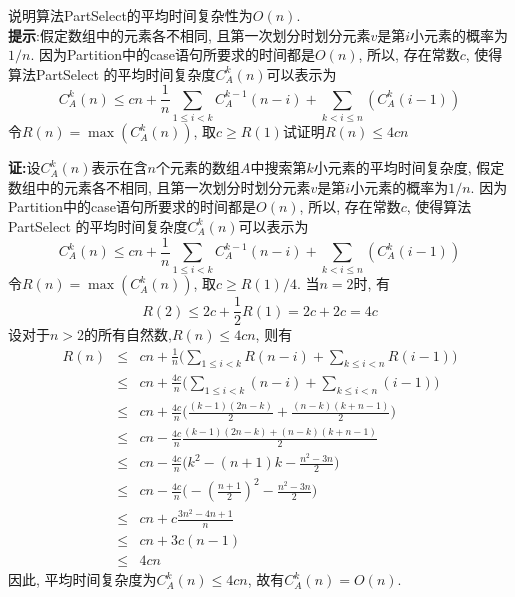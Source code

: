 \begin{problem}[习题3.4]
说明算法PartSelect的平均时间复杂性为$O(n)$.\\
\textbf{提示}:假定数组中的元素各不相同, 且第一次划分时划分元素$v$是第$i$小元素的概率为$1/n$. 因为Partition中的case语句所要求的时间都是$O(n)$, 所以, 存在常数$c$, 使得算法PartSelect 的平均时间复杂度$C_A^k(n)$可以表示为
\[
C_A^k(n)\leq cn+\frac{1}{n}\sum_{1\leq i < k}C_A^{k-1}(n-i) + \sum_{k<i\leq n}(C_A^k(i-1))
\]
令$R(n)=\max(C_A^k(n))$, 取$c\geq R(1)$试证明$R(n)\leq 4cn$
\end{problem}
\begin{solution}
\textbf{证:}设$C_A^k(n)$表示在含$n$个元素的数组$A$中搜索第$k$小元素的平均时间复杂度, 假定数组中的元素各不相同, 且第一次划分时划分元素$v$是第$i$小元素的概率为$1/n$. 因为Partition中的case语句所要求的时间都是$O(n)$, 所以, 存在常数$c$, 使得算法PartSelect 的平均时间复杂度$C_A^k(n)$可以表示为
\[
C_A^k(n)\leq cn+\frac{1}{n}\sum_{1\leq i < k}C_A^{k-1}(n-i) + \sum_{k<i\leq n}(C_A^k(i-1))
\]
令$R(n)=\max(C_A^k(n))$, 取$c\geq R(1)/4$. 当$n=2$时, 有
\[
R(2)\leq 2c + \frac{1}{2}R(1)=2c+2c = 4c
\]
设对于$n>2$的所有自然数,$R(n)\leq 4cn$, 则有
{\setlength\arraycolsep{2pt}
\begin{eqnarray}
R(n) & \leq & cn+\frac{1}{n}\Big(\sum_{1\leq i< k}R(n-i) + \sum_{k\leq i<n}R(i-1)\Big)
\nonumber\\
& \leq & cn + \frac{4c}{n}\Big(\sum_{1\leq i< k}(n-i) + \sum_{k\leq i<n}(i-1)\Big)
\nonumber\\
& \leq & cn + \frac{4c}{n}\Big(\frac{(k-1)(2n-k)}{2}+\frac{(n-k)(k+n-1)}{2}\Big)
\nonumber\\
& \leq & cn - \frac{4c}{n}\frac{(k-1)(2n-k)+(n-k)(k+n-1)}{2}
\nonumber\\
& \leq & cn - \frac{4c}{n}\Big(k^2-(n+1)k-\frac{n^2-3n}{2}\Big)
\nonumber\\
& \leq & cn - \frac{4c}{n}\Big(-(\frac{n+1}{2})^2-\frac{n^2-3n}{2}\Big)
\nonumber\\
& \leq & cn + c\frac{3n^2-4n+1}{n}
\nonumber\\
& \leq & cn + 3c(n-1)
\nonumber\\
& \leq & 4cn
\nonumber
\end{eqnarray}}
因此, 平均时间复杂度为$C_A^k(n)\leq 4cn$, 故有$C_A^k(n) = O(n)$.
\end{solution}
